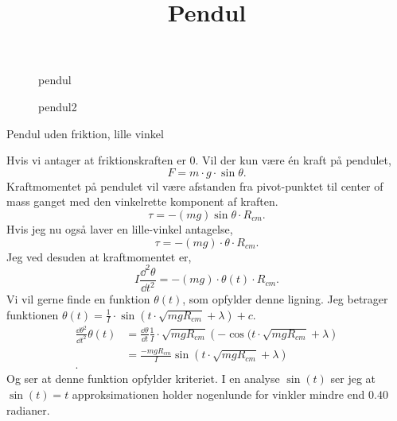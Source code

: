 
\title{\vspace{-1cm}Pendul\vspace{-1cm}}
\author{}
\date{}


\maketitle
\thispagestyle{fancy}
\begin{figure}[ht]
    \centering
    \caption{pendul}
    \label{fig:pendul}
\end{figure}
\begin{figure}[ht]
    \centering
    \caption{pendul2}
    \label{fig:pendul2}
\end{figure}
\begin{subexercise}{Pendul uden friktion, lille vinkel}

\end{subexercise}
\begin{solution}
Hvis vi antager at friktionskraften er $0$. Vil der kun være én kraft på pendulet,
 \[
F = m\cdot g\cdot \sin \theta
.\]
Kraftmomentet på pendulet vil være afstanden fra pivot-punktet til center of mass ganget med den vinkelrette komponent af kraften. 
\[
	\tau = -(mg)\sin \theta \cdot R_{cm}
.\] 
Hvis jeg nu også laver en lille-vinkel antagelse,
\[
	\tau = -(mg) \cdot \theta \cdot R_{cm}
.\]
Jeg ved desuden at kraftmomentet er,
\[
	I \frac{\dd^2 \theta}{\dd t^2} = -(mg)\cdot \theta(t)\cdot  R_{cm}
.\] 
 Vi vil gerne finde en funktion $\theta(t)$, som opfylder denne ligning. Jeg betrager funktionen $\theta (t) = \frac{1}{I}\cdot \sin(t\cdot \sqrt{mgR_{cm}}+\lambda )+c$.
\begin{align*}
	\frac{\dd \theta^2}{\dd t^2} \theta (t) &= \frac{\dd \theta}{\dd t}\frac{1}{I}\cdot \sqrt{mgR_{cm}}\left( -\cos(t\cdot \sqrt{mgR_{cm}} +\lambda \right)  \\
						&= \frac{-mgR_{cm}}{I}\sin(t\cdot \sqrt{mgR_{cm}} +\lambda) \\
.\end{align*}
Og ser at denne funktion opfylder kriteriet. I en analyse $\sin(t)$ ser jeg at $\sin(t) = t$ approksimationen holder nogenlunde for vinkler mindre end $0.40$ radianer.
\end{solution}

